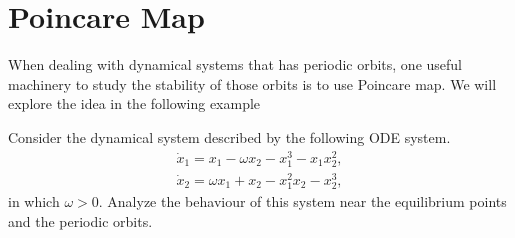 \section{Poincare Map}

When dealing with dynamical systems that has periodic orbits, one useful machinery to study the stability of those orbits is to use Poincare map. We will explore the idea in the following example


\begin{question}
	Consider the dynamical system described by the following ODE system.
	\begin{align*}
		\dot{x}_1 = x_1 - \omega x_2 - x_1^3 - x_1 x_2^2, \\
		\dot{x}_2 = \omega x_1 + x_2 - x_1^2x_2 - x_2^3,
	\end{align*}
	in which $\omega>0$. Analyze the behaviour of this system near the equilibrium points and the periodic orbits.
	
\end{question}
